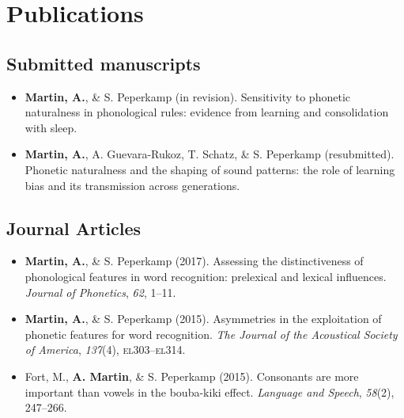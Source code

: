 \documentclass[a4paper, 10pt]{article}
\begin{document}
\section*{Publications}

\subsection*{Submitted manuscripts}

\begin{itemize}

\item \textbf{Martin, A.}, \& S. Peperkamp (in revision). Sensitivity to
  phonetic naturalness in phonological rules: evidence from learning
  and consolidation with sleep.

\item \textbf{Martin, A.}, A. Guevara-Rukoz, T. Schatz, \& S. Peperkamp
  (resubmitted). Phonetic naturalness and the shaping of sound
  patterns: the role of learning bias and its transmission across
  generations.

\end{itemize}

\subsection*{Journal Articles}

\begin{itemize}
\RaggedRight

\item \textbf{Martin, A.}, \& S. Peperkamp (2017). Assessing
  the distinctiveness of phonological features in word recognition:
  prelexical and lexical influences. \textit{Journal of Phonetics},
  \textit{62}, 1--11.

\item \textbf{Martin, A.}, \& S. Peperkamp
  (2015). Asymmetries in the exploitation of phonetic
  features for word recognition.  \textit{The Journal of the
    Acoustical Society of America}, \emph{137}(4), \textsc{el}303--\textsc{el}314.


\item Fort, M., \textbf{A. Martin}, \& S. Peperkamp (2015). {Consonants are more important than vowels in the
    bouba-kiki effect}. \textit{Language and Speech}, \emph{58}(2), 247--266.

                                                         
\end{itemize}
\end{document}

